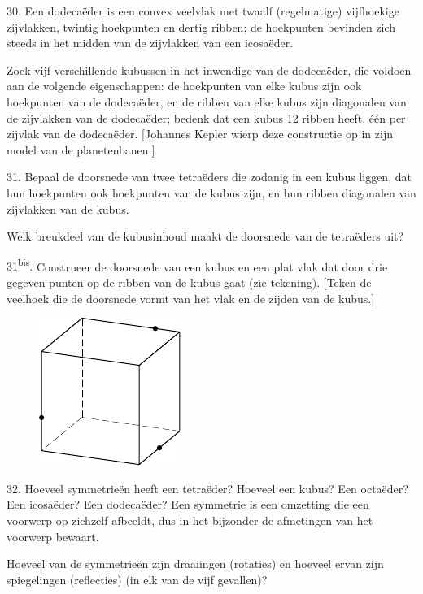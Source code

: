 \begin{problem}{30.}
	Een dodecaëder is een convex veelvlak met twaalf (regelmatige) vijfhoekige zijvlakken, twintig hoekpunten en dertig ribben; de hoek\-punten bevinden zich steeds in het midden van de zijvlakken van een icosaëder.

	Zoek vijf verschillende kubussen in het inwendige van de dode\-caëder, die voldoen aan de volgende eigenschappen: de hoekpunten van elke kubus zijn ook hoekpunten van de dodecaëder, en de ribben van elke kubus zijn diagonalen van de zijvlakken van de dodecaëder; bedenk dat een kubus 12 ribben heeft, één per zijvlak van de dodecaë\-der. [Johannes Kepler wierp deze constructie op in zijn model van de planetenbanen.]
\end{problem}

\begin{problem}{31.}
	Bepaal de doorsnede van twee tetraëders die zodanig in een kubus liggen, dat hun hoekpunten ook hoekpunten van de kubus zijn, en hun ribben diagonalen van zijvlakken van de kubus.

	Welk breukdeel van de kubusinhoud maakt de doorsnede van de tetraëders uit?
\end{problem}

\begin{problem}{31\textsuperscript{bis}.}
	Construeer de doorsnede van een kubus en een plat vlak dat door drie gegeven punten op de ribben van de kubus gaat (zie teke\-ning). [Teken de veelhoek die de doorsnede vormt van het vlak en de zijden van de kubus.]
	\begin{figure}
		\includegraphics{resources/taskbook-15}
	\end{figure}
\end{problem}

\clearpage

\begin{problem}{32.}
	Hoeveel symmetrieën heeft een tetraëder? Hoeveel een kubus? Een octaëder? Een icosaëder? Een dodecaëder? Een symmetrie is een omzetting die een voorwerp op zichzelf afbeeldt, dus in het bijzonder de afmetingen van het voorwerp bewaart.

	Hoeveel van de symmetrieën zijn draaiingen (rotaties) en hoeveel ervan zijn spiegelingen (reflecties) (in elk van de vijf gevallen)?
\end{problem}

